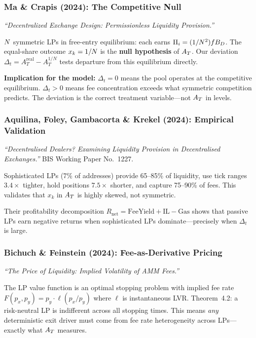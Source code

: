 \subsubsection{Ma \& Crapis (2024): The Competitive Null}

\emph{``Decentralized Exchange Design: Permissionless Liquidity Provision.''}

$N$ symmetric LPs in free-entry equilibrium: each earns
$\Pi_i = (1/N^2) f B_D$. The equal-share outcome $x_k = 1/N$
is the \textbf{null hypothesis} of $A_T$. Our deviation
$\Delta_t = A_T^{\text{real}} - A_T^{1/N}$ tests departure from this
equilibrium directly.

\textbf{Implication for the model:} $\Delta_t = 0$ means the pool operates at
the competitive equilibrium. $\Delta_t > 0$ means fee concentration exceeds
what symmetric competition predicts. The deviation is the correct treatment
variable---not $A_T$ in levels.

\subsubsection{Aquilina, Foley, Gambacorta \& Krekel (2024): Empirical Validation}

\emph{``Decentralised Dealers? Examining Liquidity Provision in Decentralised
Exchanges.''} BIS Working Paper No.~1227.

Sophisticated LPs (7\% of addresses) provide 65--85\% of liquidity, use tick
ranges $3.4\times$ tighter, hold positions $7.5\times$ shorter, and capture
75--90\% of fees. This validates that $x_k$ in $A_T$ is highly skewed, not
symmetric.

Their profitability decomposition
$R_{\text{net}} = \text{FeeYield} + \text{IL} - \text{Gas}$ shows that passive
LPs earn negative returns when sophisticated LPs dominate---precisely when
$\Delta_t$ is large.

\subsubsection{Bichuch \& Feinstein (2024): Fee-as-Derivative Pricing}

\emph{``The Price of Liquidity: Implied Volatility of AMM Fees.''}

The LP value function is an optimal stopping problem with implied fee rate
$F(p_x, p_y) = p_y \cdot \ell(p_x/p_y)$ where $\ell$ is instantaneous LVR.
Theorem~4.2: a risk-neutral LP is indifferent across all stopping times. This
means \emph{any} deterministic exit driver must come from fee rate
heterogeneity across LPs---exactly what $A_T$ measures.

